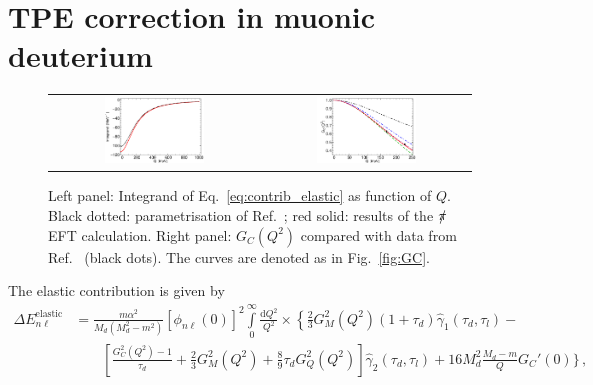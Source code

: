\documentclass[prl,
twocolumn,
showpacs,preprintnumbers,amsmath,amssymb,
superscriptaddress,
a4paper,nofootinbib,longbibliography]{revtex4-2}
\def\piEFT/{$\slashed{\pi}$EFT}
\begin{document}
\section{TPE correction in muonic deuterium}
\begin{figure}[htb]
    \centering
    \begin{tabular}{cc}
    \includegraphics[width=0.5\textwidth]{figs/elastic.pdf}
    &
    \includegraphics[width=0.5\textwidth]{figs/GCdata.pdf}
    \end{tabular}
    \caption{Left panel: Integrand of Eq.~\eqref{eq:contrib_elastic} as function of $Q$. Black dotted: parametrisation of Ref.~\cite{Abbott:2000ak}; red solid: results of the \piEFT/ calculation. Right panel: $G_C(Q^2)$ compared with data from Ref.~\cite{Abbott:2000ak} (black dots). The curves are denoted as in Fig.~\ref{fig:GC}.}
    \label{fig:elastic_integrand}
\end{figure}
The elastic contribution is given by~\cite{Carlson:2013xea}
\begin{align}
\Delta E_{n\ell}^\mathrm{elastic} & = \frac{m \alpha^2}{M_d(M_d^2-m^2)}[\phi_{n\ell}(0)]^2
\int\limits_0^\infty\frac{\mathrm{d}Q^2}{Q^2} 
 \times\left\{
\frac{2}{3}G_M^2(Q^2)
(1+\tau_d)\hat{\gamma}_1(\tau_d,\tau_l)
- \right. \nonumber\\
& \qquad \left. %
\left[\frac{G_C^2(Q^2)-1}{\tau_d}+\frac{2}{3}G_M^2(Q^2)+\frac{8}{9}\tau_d G_Q^2(Q^2)\right]
\hat{\gamma}_2(\tau_d,\tau_l)
\right. +16M_d^2\frac{M_d-m}{Q}G_C'(0)
\bigg\}\,,\label{eq:contrib_elastic}
\end{align}
\end{document}
